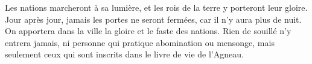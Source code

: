 Les nations marcheront à sa lumière,
	et les rois de la terre y porteront leur gloire.
Jour après jour, jamais les portes ne seront fermées,
	car il n’y aura plus de nuit.
On apportera dans la ville la gloire et le faste des nations.
Rien de souillé n’y entrera jamais,
	ni personne qui pratique abomination ou mensonge,
	mais seulement ceux qui sont inscrits dans le livre de vie de l’Agneau.
